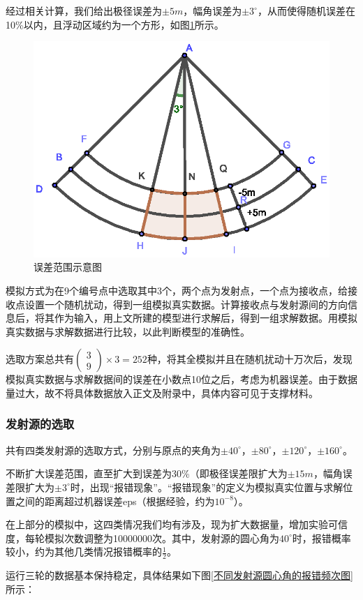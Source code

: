 \documentclass{ctexart}
\begin{document}
经过相关计算，我们给出极径误差为$\pm 5m $，幅角误差为$\pm 3^{\circ}$，从而使得随机误差在10\%以内，且浮动区域约为一个方形，如图\ref{误差范围示意图}所示。

\begin{figure}[H]
  \centering
  \includegraphics[width=0.45\linewidth]{pic/error area.eps}
  \caption{误差范围示意图}
  \label{误差范围示意图}
  \end{figure}

模拟方式为在9个编号点中选取其中3个，两个点为发射点，一个点为接收点，给接收点设置一个随机扰动，得到一组模拟真实数据。计算接收点与发射源间的方向信息后，将其作为输入，用上文所建的模型进行求解后，得到一组求解数据。用模拟真实数据与求解数据进行比较，以此判断模型的准确性。

选取方案总共有$\begin{pmatrix} 3 \\ 9 \end{pmatrix}\times 3=252$种，将其全模拟并且在随机扰动十万次后，发现模拟真实数据与求解数据间的误差在小数点10位之后，考虑为机器误差。由于数据量过大，故不将具体数据放入正文及附录中，具体内容可见于支撑材料。

\subsubsection{发射源的选取}

共有四类发射源的选取方式，分别与原点的夹角为$\pm 40^{\circ}$，$\pm 80^{\circ}$，$\pm 120^{\circ}$，$\pm 160^{\circ}$。

不断扩大误差范围，直至扩大到误差为30\%（即极径误差限扩大为$\pm 15m$，幅角误差限扩大为$\pm 3^{\circ}$时，出现“报错现象”。“报错现象”的定义为模拟真实位置与求解位置之间的距离超过机器误差eps（根据经验，约为$10^{-8}$）。

在上部分的模拟中，这四类情况我们均有涉及，现为扩大数据量，增加实验可信度，每轮模拟次数调整为10000000次。其中，发射源的圆心角为$40^{\circ}$时，报错概率较小，约为其他几类情况报错概率的$\frac{1}{2}$。

运行三轮的数据基本保持稳定，具体结果如下图\ref{不同发射源圆心角的报错频次图}所示：
\end{document}
